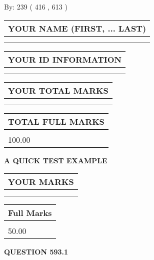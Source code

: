 \documentclass[12pt]{article}
\begin{document}
   
\hspace{1.0in} By: 
 239 ( 416 ,  613 )
   
   
   
   
\newpage 
\setcounter{page}{ 
   593001 } 
   
   
   
   
\noindent\begin{tabular}{|l|}
\hline
YOUR NAME (FIRST, ... LAST)  \\
\hline
 \\ 
 \\ 
\hline
\end{tabular}
\hspace{0.05in} \begin{tabular}{|l|}
\hline
 YOUR   ID   INFORMATION  \\
\hline
 \\ 
 \\ 
\hline
\end{tabular}
   
   
\vspace{0.2in}\noindent\begin{tabular}{|l|}
\hline
YOUR TOTAL MARKS  \\
\hline
 \\ 
 \\ 
\hline
\end{tabular}
\hspace{0.05in} \begin{tabular}{|l|}
\hline
TOTAL FULL MARKS  \\
\hline
 \\ 
100.00 \\
\hline
\end{tabular}
   
   
 \vspace{0.2in}
{\LARGE {\textbf{ A QUICK TEST EXAMPLE}}}
   
   
  
\vspace{0.2in}
  
\noindent\begin{tabular}{|l|}
\hline
 YOUR MARKS  \\
\hline
 \\ 
 \\ 
\hline
\end{tabular}
\hspace{0.05in} \begin{tabular}{|l|}
\hline
 Full Marks  \\
\hline
 \\ 
50.00 \\
\hline
\end{tabular}
{\textbf{\Large{QUESTION
593.1 
}}}
  
\end{document}
